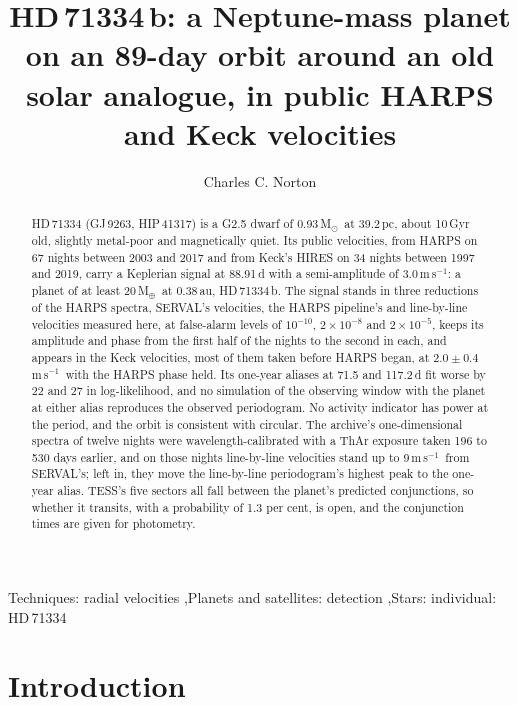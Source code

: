 \documentclass[3p,11pt]{elsarticle}
\newcommand{\ms}{m\,s$^{-1}$}
\newcommand{\Msun}{M$_\odot$}
\newcommand{\Mearth}{M$_\oplus$}
\begin{document}
\begin{frontmatter}

\title{HD\,71334\,b: a Neptune-mass planet on an 89-day orbit around an old solar analogue, in public
HARPS and Keck velocities}

\author{Charles C. Norton}

\begin{abstract}
HD\,71334 (GJ\,9263, HIP\,41317) is a G2.5 dwarf of 0.93\,\Msun\ at 39.2\,pc, about 10\,Gyr old,
slightly metal-poor and magnetically quiet. Its public velocities, from HARPS on 67 nights between 2003
and 2017 and from Keck's HIRES on 34 nights between 1997 and 2019, carry a Keplerian signal at
88.91\,d with a semi-amplitude of 3.0\,\ms: a planet of at least 20\,\Mearth\ at 0.38\,au,
HD\,71334\,b. The signal stands in three reductions of the HARPS spectra, SERVAL's
velocities, the HARPS pipeline's and line-by-line velocities measured here, at false-alarm levels of
$10^{-10}$, $2\times10^{-8}$ and $2\times10^{-5}$, keeps its amplitude and phase from the first half
of the nights to the second in each, and appears in the Keck velocities, most of them taken before
HARPS began, at $2.0 \pm 0.4$\,\ms\ with the HARPS phase held. Its one-year aliases at 71.5 and
117.2\,d fit worse by 22 and 27 in log-likelihood, and no simulation of the observing window with
the planet at either alias reproduces the observed periodogram. No activity indicator has power at
the period, and the orbit is consistent with circular. The archive's one-dimensional spectra of twelve
nights were wavelength-calibrated with a ThAr exposure taken 196 to 530 days earlier, and on those
nights line-by-line velocities stand up to 9\,\ms\ from SERVAL's; left in, they move the line-by-line
periodogram's highest peak to the one-year alias. TESS's five sectors all fall between the planet's
predicted conjunctions, so whether it transits, with a probability of 1.3 per cent, is open, and the
conjunction times are given for photometry.
\end{abstract}

\begin{keyword}
Techniques: radial velocities \sep Planets and satellites: detection \sep Stars: individual: HD\,71334
\end{keyword}

\end{frontmatter}

\section{Introduction}\label{sec:intro}
\end{document}
